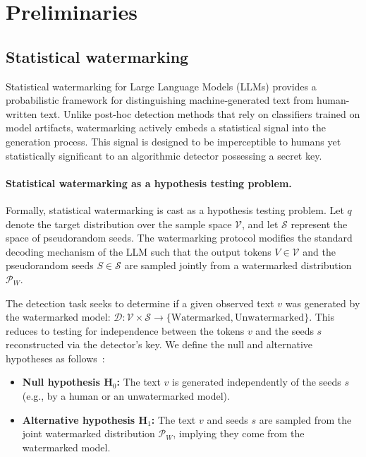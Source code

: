 
\section{Preliminaries}

\subsection{Statistical watermarking}

Statistical watermarking for Large Language Models (LLMs) provides a probabilistic framework for distinguishing machine-generated text from human-written text. Unlike post-hoc detection methods that rely on classifiers trained on model artifacts, watermarking actively embeds a statistical signal into the generation process. This signal is designed to be imperceptible to humans yet statistically significant to an algorithmic detector possessing a secret key.

\paragraph{Statistical watermarking as a hypothesis testing problem.}
Formally, statistical watermarking is cast as a hypothesis testing problem. Let $q$ denote the target distribution over the sample space $\mathcal{V}$, and let $\mathcal{S}$ represent the space of pseudorandom seeds. The watermarking protocol modifies the standard decoding mechanism of the LLM such that the output tokens $V \in \mathcal{V}$ and the pseudorandom seeds $S \in \mathcal{S}$ are sampled jointly from a watermarked distribution $\mathcal{P}_W$. 

The detection task seeks to determine if a given observed text $v$ was generated by the watermarked model: $\mathcal{D}: \mathcal{V} \times \mathcal{S} \to \{\text{Watermarked}, \text{Unwatermarked}\}$. This reduces to testing for independence between the tokens $v$ and the seeds $s$ reconstructed via the detector's key. We define the null and alternative hypotheses as follows~\citep{huang2023towards}:
\begin{itemize}
    \item \textbf{Null hypothesis $\textbf{H}_0$:} The text $v$ is generated independently of the seeds $s$ (e.g., by a human or an unwatermarked model).
    \item \textbf{Alternative hypothesis $\textbf{H}_1$:} The text $v$ and seeds $s$ are sampled from the joint watermarked distribution $\mathcal{P}_W$, implying they come from the watermarked model.
\end{itemize}


